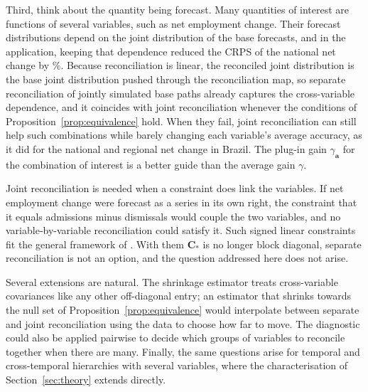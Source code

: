 Third, think about the quantity being forecast. Many quantities of interest are functions of several variables, such as net employment change. Their forecast distributions depend on the joint distribution of the base forecasts, and in the application, keeping that dependence reduced the CRPS of the national net change by \appNetJointSepTotal\%. Because reconciliation is linear, the reconciled joint distribution is the base joint distribution pushed through the reconciliation map, so separate reconciliation of jointly simulated base paths already captures the cross-variable dependence, and it coincides with joint reconciliation whenever the conditions of Proposition~\ref{prop:equivalence} hold. When they fail, joint reconciliation can still help such combinations while barely changing each variable's average accuracy, as it did for the national and regional net change in Brazil. The plug-in gain $\gamma_{\bm{a}}$ for the combination of interest is a better guide than the average gain $\gamma$.

Joint reconciliation is needed when a constraint does link the variables. If net employment change were forecast as a series in its own right, the constraint that it equals admissions minus dismissals would couple the two variables, and no variable-by-variable reconciliation could satisfy it. Such signed linear constraints fit the general framework of \citet{girolimetto2024point}. With them $\bm{C}_*$ is no longer block diagonal, separate reconciliation is not an option, and the question addressed here does not arise.

Several extensions are natural. The shrinkage estimator treats cross-variable covariances like any other off-diagonal entry; an estimator that shrinks towards the null set of Proposition~\ref{prop:equivalence} would interpolate between separate and joint reconciliation using the data to choose how far to move. The diagnostic could also be applied pairwise to decide which groups of variables to reconcile together when there are many. Finally, the same questions arise for temporal and cross-temporal hierarchies with several variables, where the characterisation of Section~\ref{sec:theory} extends directly.


